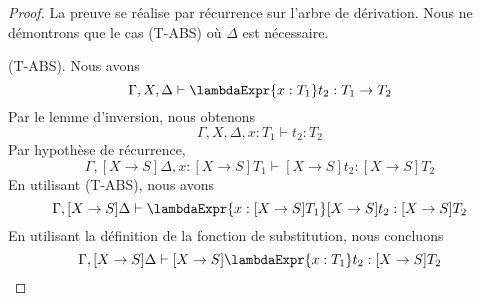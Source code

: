 \begin{proof}
  \label{proof:system-f-preservation-substitution-type}
  La preuve se réalise par récurrence sur l'arbre de dérivation. Nous ne
  démontrons que le cas (T-ABS) où $\Delta$ est nécessaire.

   (T-ABS). Nous avons
   \begin{equation*}
     \Gamma, X, \Delta \vdash \lambdaExpr{x : T_{1}}t_{2} : T_{1} \rightarrow T_{2}
   \end{equation*}
   Par le lemme d'inversion, nous obtenons
   \begin{equation*}
     \Gamma, X, \Delta, x : T_{1} \vdash t_{2} : T_{2}
   \end{equation*}
   Par hypothèse de récurrence,
   \begin{equation*}
     \Gamma, [X \rightarrow S]\Delta, x : [X \rightarrow S]T_{1} \vdash [X
     \rightarrow S]t_{2} : [X \rightarrow S]T_{2}
   \end{equation*}
   En utilisant (T-ABS), nous avons
   \begin{equation*}
     \Gamma, [X \rightarrow S]\Delta \vdash \lambdaExpr{x : [X \rightarrow S]T_{1}}[X
     \rightarrow S]t_{2} : [X \rightarrow S]T_{2}
   \end{equation*}
   En utilisant la définition de la fonction de substitution, nous concluons
   \begin{equation*}
     \Gamma, [X \rightarrow S]\Delta \vdash [X \rightarrow S]\lambdaExpr{x :
       T_{1}} t_{2} : [X \rightarrow S]T_{2}
   \end{equation*}
   

\end{proof}


